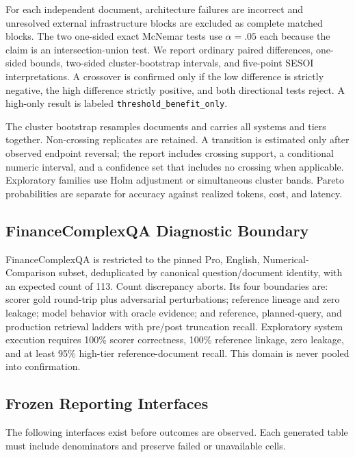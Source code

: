 For each independent document, architecture failures are incorrect and
unresolved external infrastructure blocks are excluded as complete matched
blocks. The two one-sided exact McNemar tests use $\alpha=.05$ each because the
claim is an intersection-union test. We report ordinary paired differences,
one-sided bounds, two-sided cluster-bootstrap intervals, and five-point SESOI
interpretations. A crossover is confirmed only if the low difference is
strictly negative, the high difference strictly positive, and both directional
tests reject. A high-only result is labeled \texttt{threshold\_benefit\_only}.

The cluster bootstrap resamples documents and carries all systems and tiers
together. Non-crossing replicates are retained. A transition is estimated only
after observed endpoint reversal; the report includes crossing support, a
conditional numeric interval, and a confidence set that includes no crossing
when applicable. Exploratory families use Holm adjustment or simultaneous
cluster bands. Pareto probabilities are separate for accuracy against realized
tokens, cost, and latency.

\subsection{FinanceComplexQA Diagnostic Boundary}

FinanceComplexQA is restricted to the pinned Pro, English,
Numerical-Comparison subset, deduplicated by canonical question/document
identity, with an expected count of 113. Count discrepancy aborts. Its four
boundaries are: scorer gold round-trip plus adversarial perturbations; reference
lineage and zero leakage; model behavior with oracle evidence; and reference,
planned-query, and production retrieval ladders with pre/post truncation recall.
Exploratory system execution requires 100\% scorer correctness, 100\% reference
linkage, zero leakage, and at least 95\% high-tier reference-document recall.
This domain is never pooled into confirmation.

\subsection{Frozen Reporting Interfaces}

The following interfaces exist before outcomes are observed. Each generated
table must include denominators and preserve failed or unavailable cells.

